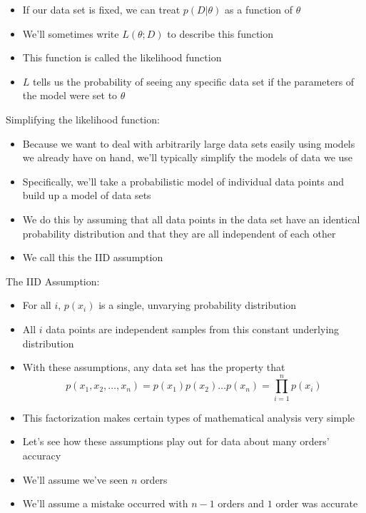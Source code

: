 \documentclass{beamer}
\begin{document}
\frame
{
  \begin{itemize}
    \item{If our data set is fixed, we can treat $p(D | \theta)$ as a function of $\theta$}
    \item{We'll sometimes write $L(\theta; D)$ to describe this function}
    \item{This function is called the likelihood function}
    \item{$L$ tells us the probability of seeing any specific data set if the parameters of the model were set to $\theta$}
  \end{itemize}
}

\frame
{
  Simplifying the likelihood function:
  \begin{itemize}
    \item{Because we want to deal with arbitrarily large data sets easily using models we already have on hand, we'll typically simplify the models of data we use}
    \item{Specifically, we'll take a probabilistic model of individual data points and build up a model of data sets}
    \item{We do this by assuming that all data points in the data set have an identical probability distribution and that they are all independent of each other}
    \item{We call this the IID assumption}
  \end{itemize}
}

\frame
{
  The IID Assumption:
  \begin{itemize}
    \item{For all $i$, $p(x_i)$ is a single, unvarying probability distribution}
    \item{All $i$ data points are independent samples from this constant underlying distribution}
    \item{With these assumptions, any data set has the property that}
    \[
      p(x_1, x_2, \ldots, x_n) = p(x_1) p(x_2) \ldots p(x_n) = \prod_{i = 1}^{n} p(x_i)
    \]
    \item{This factorization makes certain types of mathematical analysis very simple}
  \end{itemize}
}

\frame
{
  \begin{itemize}
    \item{Let's see how these assumptions play out for data about many orders' accuracy}
    \item{We'll assume we've seen $n$ orders}
    \item{We'll assume a mistake occurred with $n - 1$ orders and $1$ order was accurate}
  \end{itemize}
}
\end{document}
